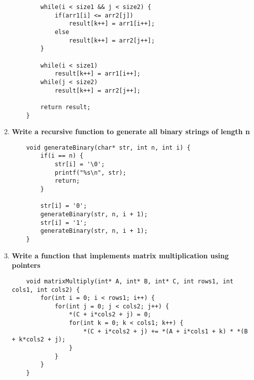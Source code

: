 \documentclass{article}
\begin{document}
\begin{enumerate}
\begin{lstlisting}
        while(i < size1 && j < size2) {
            if(arr1[i] <= arr2[j])
                result[k++] = arr1[i++];
            else
                result[k++] = arr2[j++];
        }
        
        while(i < size1)
            result[k++] = arr1[i++];
        while(j < size2)
            result[k++] = arr2[j++];
            
        return result;
    }
    \end{lstlisting}

    \item \textbf{Write a recursive function to generate all binary strings of length n}
    \begin{lstlisting}
    void generateBinary(char* str, int n, int i) {
        if(i == n) {
            str[i] = '\0';
            printf("%s\n", str);
            return;
        }
        
        str[i] = '0';
        generateBinary(str, n, i + 1);
        str[i] = '1';
        generateBinary(str, n, i + 1);
    }
    \end{lstlisting}

    \item \textbf{Write a function that implements matrix multiplication using pointers}
    \begin{lstlisting}
    void matrixMultiply(int* A, int* B, int* C, int rows1, int cols1, int cols2) {
        for(int i = 0; i < rows1; i++) {
            for(int j = 0; j < cols2; j++) {
                *(C + i*cols2 + j) = 0;
                for(int k = 0; k < cols1; k++) {
                    *(C + i*cols2 + j) += *(A + i*cols1 + k) * *(B + k*cols2 + j);
                }
            }
        }
    }
    \end{lstlisting}


\end{enumerate}
\end{document}
